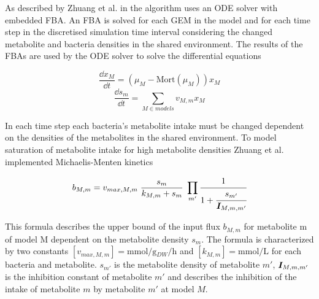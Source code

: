 As described by Zhuang et al. in \cite{zhuang_genome-scale_2011} the algorithm uses an ODE solver with embedded FBA. An FBA is solved
for each GEM in the model and for each time step in the discretised simulation time interval considering the changed metabolite and
bacteria densities in the shared environment. The results of the FBAs are used by the ODE solver to solve the differential equations

\begin{equation} \label{eq:diff_eq_x}
	\frac{\dd x_M}{\dd t} = (\mu_M - \mathrm{Mort}(\mu_M)) x_M
\end{equation}
\begin{equation} \label{eq:diff_eq_s}
	\frac{\dd s_m}{\dd t} = \displaystyle\sum_{M \in models} v_{M,m} x_M
\end{equation}


In each time step each bacteria's metabolite intake must be changed dependent on the densities of the metabolites in the shared environment.
To model saturation of metabolite intake for high metabolite densities Zhuang et al. implemented Michaelis-Menten kinetics \cite{johnson2011original}

\begin{equation} \label{eq:michaelis-menten}
 b_{M,m} = v_{max,M,m} \; \frac{s_m}{k_{M,m}+s_m} \; \prod_{m'} \cfrac{1}{1+\cfrac{s_{m'}}{\mat{I}_{M,m,m'}}}
\end{equation}

This formula describes the upper bound of the input flux $b_{M,m}$ for metabolite m of model M dependent on the metabolite density
$s_m$. The formula is characterized by two constants $\left[ v_{max,M,m} \right] = \si{\milli\mole\per\gram_{DW}\per\hour}$ and $\left[ k_{M,m} \right] = \si{\milli\mole\per\liter}$
for each bacteria and metabolite. $s_{m'}$ is the metabolite density of metabolite $m'$, $\bm{I}_{M,m,m'}$ is the inhibition constant of metabolite $m'$ and
describes the inhibition of the intake of metabolite $m$ by metabolite $m'$ at model $M$.

